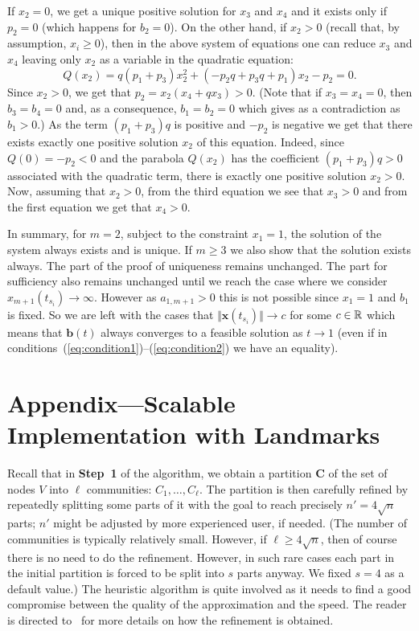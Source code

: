 If $x_2=0$, we get a unique positive solution for $x_3$ and $x_4$ and it exists only if $p_2=0$ (which happens for $b_2=0$).
On the other hand, if $x_2>0$ (recall that, by assumption, $x_i \ge 0$), then in the above system of equations one can reduce $x_3$ and $x_4$ leaving only $x_2$ as a variable in the quadratic equation:
$$
Q(x_2)=q(p_1+p_3)x_2^2+(-p_2q+p_3q+p_1)x_2-p_2 = 0.
$$
Since $x_2 > 0$, we get that $p_2 =x_2(x_4+qx_3) > 0$. (Note that if $x_3=x_4=0$, then $b_3=b_4=0$ and, as a consequence, $b_1=b_2=0$ which gives as a contradiction as $b_1>0$.) As the term $(p_1+p_3)q$ is positive and $-p_2$ is negative we get that there exists exactly one positive solution $x_2$ of this equation. Indeed, since $Q(0) = -p_2 <0$ and the parabola $Q(x_2)$ has the coefficient $(p_1+p_3)q>0$ associated with the quadratic term, there is exactly one positive solution $x_2 > 0$. Now, assuming that $x_2>0$, from the third equation we see that $x_3>0$ and from the first equation we get that $x_4>0$. 

In summary, for $m=2$, subject to the constraint $x_1=1$, the solution of the system always exists and is unique.
If $m\geq3$ we also show that the solution exists always. The part of the proof of uniqueness remains unchanged. The part for sufficiency also remains unchanged until we reach the case where we consider $x_{m+1}(t_{s_i}) \to\infty$. However as $a_{1,m+1}>0$ this is not possible since $x_1=1$ and $b_1$ is fixed. So we are left with the cases that $\Vert \mathbf{x}(t_{s_i}) \Vert \to c$ for some $c \in {\mathbb R}$ which means that $\mathbf{b}(t)$ always converges to a feasible solution as $t\to1$ (even if in conditions~(\ref{eq:condition1})--(\ref{eq:condition2}) we have an equality).




\section{Appendix---Scalable Implementation with Landmarks}\label{apdx:landmarks}

Recall that in \textbf{Step~1} of the algorithm, we obtain a partition $\textbf{C}$ of the set of nodes $V$ into $\ell$ communities: $C_1, \ldots, C_\ell$. The partition is then carefully refined by repeatedly splitting some parts of it with the goal to reach precisely $n'=4 \sqrt{n}$ parts; $n'$ might be adjusted by more experienced user, if needed. (The number of communities is typically relatively small. However, if $\ell \ge 4 \sqrt{n}$, then of course there is no need to do the refinement. However, in such rare cases each part in the initial partition is forced to be split into $s$ parts anyway. We fixed $s=4$ as a default value.) The heuristic algorithm is quite involved as it needs to find a good compromise between the quality of the approximation and the speed. The reader is directed to~\cite{Embedding_Complex_Networks_Scalable} for more details on how the refinement is obtained. 

